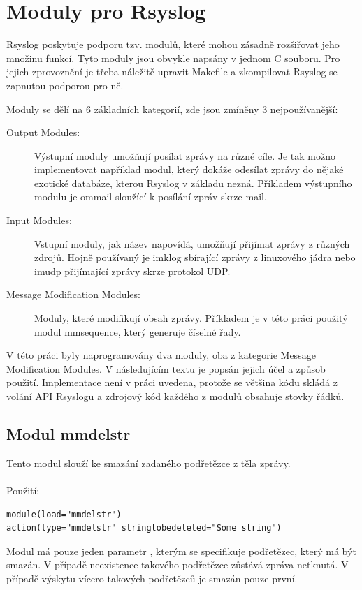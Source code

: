 \documentclass[thesis=B,czech]{FITthesis}[2012/06/26]
\begin{document}
\section{Moduly pro Rsyslog}
Rsyslog poskytuje podporu tzv. modulů, které mohou zásadně rozšiřovat jeho množinu funkcí. Tyto moduly jsou obvykle napsány v jednom C souboru. Pro jejich zprovoznění je třeba náležitě upravit Makefile a zkompilovat Rsyslog se zapnutou podporou pro ně.

Moduly se dělí na 6 základních kategorií, zde jsou zmíněny 3 nejpoužívanější:

\begin{description}
  \item [Output Modules:] Výstupní moduly umožňují posílat zprávy na různé cíle. Je tak možno implementovat například modul, který dokáže odesílat zprávy do nějaké exotické databáze, kterou Rsyslog v základu nezná. Příkladem výstupního modulu je ommail sloužící k posílání zpráv skrze mail.
  \item [Input Modules:] Vstupní moduly, jak název napovídá, umožňují přijímat zprávy z různých zdrojů. Hojně používaný je imklog sbírající zprávy z linuxového jádra nebo imudp přijímající zprávy skrze protokol UDP.
  \item [Message Modification Modules:] Moduly, které modifikují obsah zprávy. Příkladem je v této práci použitý modul mmsequence, který generuje číselné řady.
\end{description}

V této práci byly naprogramovány dva moduly, oba z kategorie Message Modification Modules. V následujícím textu je popsán jejich účel a způsob použití. Implementace není v práci uvedena, protože se většina kódu skládá z volání API Rsyslogu a zdrojový kód každého z modulů obsahuje stovky řádků.

\subsection{Modul mmdelstr}
Tento modul slouží ke smazání zadaného podřetězce z těla zprávy.
\\
\\
Použití:
\begin{lstlisting}[style=RainerScriptSimpleStyle]
module(load="mmdelstr") 
action(type="mmdelstr" stringtobedeleted="Some string")
\end{lstlisting}

Modul má pouze jeden parametr , kterým se specifikuje podřetězec, který má být smazán. V případě neexistence takového podřetězce zůstává zpráva netknutá. V případě výskytu vícero takových podřetězců je smazán pouze první.
\end{document}

